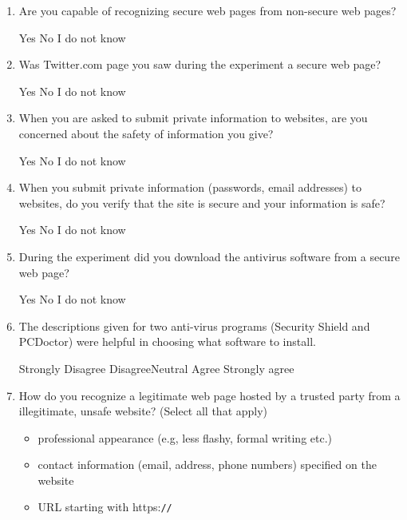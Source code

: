 \begin{enumerate}[noitemsep]
\item Are you capable of recognizing secure web pages from non-secure web pages?
\par Yes \hspace{1cm} No \hspace{1cm} I do not know
\item Was Twitter.com page you saw during the experiment a secure web page?
\par Yes \hspace{1cm} No \hspace{1cm} I do not know
\item When you are asked to submit private information to websites, are you concerned about the safety of information you give?
\par Yes \hspace{1cm} No \hspace{1cm} I do not know
\item  When you submit private information (passwords, email addresses) to websites, do you verify that the site is secure and your information is safe?
\par Yes \hspace{1cm} No \hspace{1cm} I do not know
\item During the experiment did you download the antivirus software from a secure web page?
\par Yes \hspace{1cm} No \hspace{1cm} I do not know
\item The descriptions given for two anti-virus programs (Security Shield and PCDoctor) were helpful in choosing what software to install.
\par Strongly Disagree \hspace{1cm} Disagree\hspace{1cm}Neutral\hspace{1cm} Agree\hspace{1cm} Strongly agree
\item How do you recognize a legitimate web page hosted by a trusted party from a illegitimate,
unsafe website? (Select all that apply)
\begin{itemize}[topsep=-6em, label={o}]
\itemsep-1em 
\item professional appearance (e.g, less flashy, formal writing etc.)
\item contact information (email, address, phone numbers) specified on the website
\item URL starting with https:\verb|//|

\end{itemize}
\end{enumerate}
